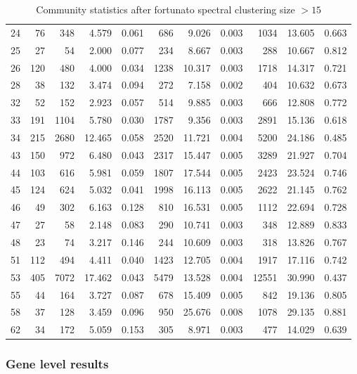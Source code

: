 \begin{table}[ht]
\begin{adjustbox}{max width=\textwidth}
\begin{tabular}{lrrrrrrrrrr}
  24 & 76 & 348 & 4.579 & 0.061 & 686 & 9.026 & 0.003 & 1034 & 13.605 & 0.663 \\ 
  25 & 27 & 54 & 2.000 & 0.077 & 234 & 8.667 & 0.003 & 288 & 10.667 & 0.812 \\ 
  26 & 120 & 480 & 4.000 & 0.034 & 1238 & 10.317 & 0.003 & 1718 & 14.317 & 0.721 \\ 
  28 & 38 & 132 & 3.474 & 0.094 & 272 & 7.158 & 0.002 & 404 & 10.632 & 0.673 \\ 
  32 & 52 & 152 & 2.923 & 0.057 & 514 & 9.885 & 0.003 & 666 & 12.808 & 0.772 \\ 
  33 & 191 & 1104 & 5.780 & 0.030 & 1787 & 9.356 & 0.003 & 2891 & 15.136 & 0.618 \\ 
  34 & 215 & 2680 & 12.465 & 0.058 & 2520 & 11.721 & 0.004 & 5200 & 24.186 & 0.485 \\ 
  43 & 150 & 972 & 6.480 & 0.043 & 2317 & 15.447 & 0.005 & 3289 & 21.927 & 0.704 \\ 
  44 & 103 & 616 & 5.981 & 0.059 & 1807 & 17.544 & 0.005 & 2423 & 23.524 & 0.746 \\ 
  45 & 124 & 624 & 5.032 & 0.041 & 1998 & 16.113 & 0.005 & 2622 & 21.145 & 0.762 \\ 
  46 & 49 & 302 & 6.163 & 0.128 & 810 & 16.531 & 0.005 & 1112 & 22.694 & 0.728 \\ 
  47 & 27 & 58 & 2.148 & 0.083 & 290 & 10.741 & 0.003 & 348 & 12.889 & 0.833 \\ 
  48 & 23 & 74 & 3.217 & 0.146 & 244 & 10.609 & 0.003 & 318 & 13.826 & 0.767 \\ 
  51 & 112 & 494 & 4.411 & 0.040 & 1423 & 12.705 & 0.004 & 1917 & 17.116 & 0.742 \\ 
  53 & 405 & 7072 & 17.462 & 0.043 & 5479 & 13.528 & 0.004 & 12551 & 30.990 & 0.437 \\ 
  55 & 44 & 164 & 3.727 & 0.087 & 678 & 15.409 & 0.005 & 842 & 19.136 & 0.805 \\ 
  58 & 37 & 128 & 3.459 & 0.096 & 950 & 25.676 & 0.008 & 1078 & 29.135 & 0.881 \\ 
  62 & 34 & 172 & 5.059 & 0.153 & 305 & 8.971 & 0.003 & 477 & 14.029 & 0.639 \\ 
   \hline
\end{tabular}
\end{adjustbox}
\caption{Community statistics after fortunato spectral clustering size $> 15$} 
\label{tab:Community statistics after fortunato spectral clustering size > 15}
\end{table}
\subsubsection{Gene level results}

